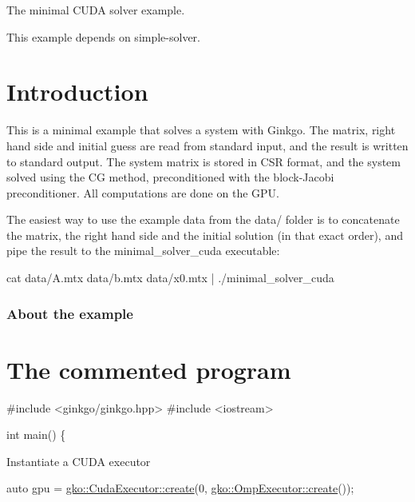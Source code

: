 The minimal C\+U\+DA solver example.

This example depends on simple-\/solver.

 \label{_Intro}%
 \label{_Introduction}%
\section*{Introduction}

This is a minimal example that solves a system with Ginkgo. The matrix, right hand side and initial guess are read from standard input, and the result is written to standard output. The system matrix is stored in C\+SR format, and the system solved using the CG method, preconditioned with the block-\/\+Jacobi preconditioner. All computations are done on the G\+PU.

The easiest way to use the example data from the data/ folder is to concatenate the matrix, the right hand side and the initial solution (in that exact order), and pipe the result to the minimal\+\_\+solver\+\_\+cuda executable\+:


\begin{DoxyCode}
cat data/A.mtx data/b.mtx data/x0.mtx | ./minimal\_solver\_cuda
\end{DoxyCode}


\label{_Abouttheexample}%
\subsubsection*{About the example }

\label{_CommProg}%
 \section*{The commented program}


\begin{DoxyCode}
\textcolor{preprocessor}{#include <ginkgo/ginkgo.hpp>}
\textcolor{preprocessor}{#include <iostream>}

\textcolor{keywordtype}{int} main()
\{
\end{DoxyCode}


Instantiate a C\+U\+DA executor


\begin{DoxyCode}
\textcolor{keyword}{auto} gpu = \hyperlink{classgko_1_1CudaExecutor_a2718a92034350650ef406ffdb60db090}{gko::CudaExecutor::create}(0, 
      \hyperlink{classgko_1_1OmpExecutor_a33ca05fdd0fc928ee262fc9425304874}{gko::OmpExecutor::create}());
\end{DoxyCode}


